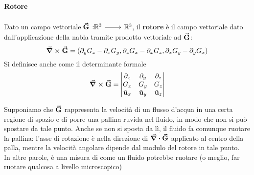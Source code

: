 \paragraph{Rotore}
\begin{define}[Rotore]
	Dato un campo vettoriale $\funz[\vba{G}]{\realset^3}{\realset^3}$, il \textbf{rotore} è il campo vettoriale dato dall'applicazione della nabla tramite prodotto vettoriale ad $\vb*{\va{G}}$:
	\begin{equation}
		\curl{\vb*{\va{G}}}=(\partial_yG_z-\partial_xG_y,\partial_zG_x-\partial_xG_z,\partial_xG_y-\partial_yG_x)
	\end{equation}
	Si definisce anche come il determinante formale
	\begin{equation}
		\curl{\vb*{\va{G}}}=\begin{vmatrix}
			\partial_x & \partial_y & \partial_z\\
			G_x & G_y & G_z\\
			\hat{\mathbf{u}}_x & \hat{\mathbf{u}}_y & \hat{\mathbf{u}}_z
		\end{vmatrix}
	\end{equation}
\end{define}
\begin{example}
	Supponiamo che $\vb*{\va{G}}$ rappresenta la velocità di un flusso d'acqua in una certa regione di spazio e di porre una pallina ruvida nel fluido, in modo che non si può spostare da tale punto. Anche se non si sposta da lì, il fluido fa comunque ruotare la pallina: l'asse di rotazione è nella direzione di $\grad \vdot \vba{G}$ applicato al centro della palla, mentre la velocità angolare dipende dal modulo del rotore in tale punto.\\
	In altre parole, è una misura di come un fluido potrebbe ruotare (o meglio, far ruotare qualcosa a livello microscopico)
\end{example}
